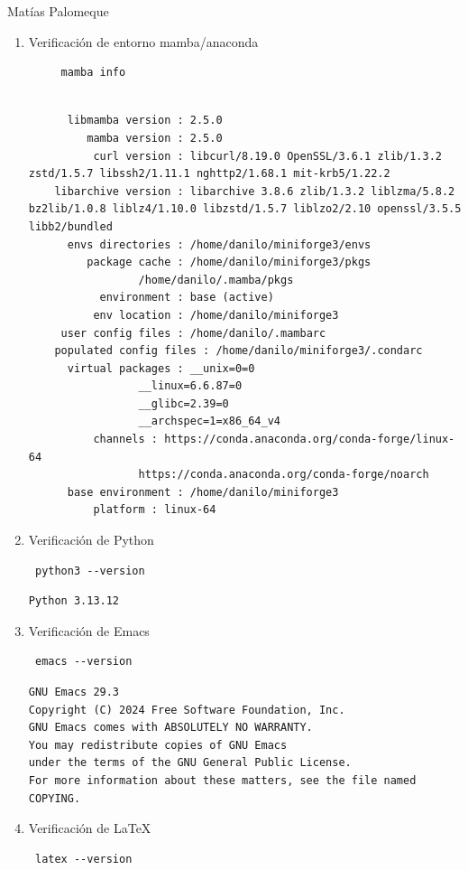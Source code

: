 \documentclass[11pt]{article}
\begin{document}
Matías Palomeque
\begin{enumerate}
\item Verificación de entorno mamba/anaconda
\begin{verbatim}
     mamba info
\end{verbatim}

\begin{verbatim}

	  libmamba version : 2.5.0
	     mamba version : 2.5.0
	      curl version : libcurl/8.19.0 OpenSSL/3.6.1 zlib/1.3.2 zstd/1.5.7 libssh2/1.11.1 nghttp2/1.68.1 mit-krb5/1.22.2
	libarchive version : libarchive 3.8.6 zlib/1.3.2 liblzma/5.8.2 bz2lib/1.0.8 liblz4/1.10.0 libzstd/1.5.7 liblzo2/2.10 openssl/3.5.5 libb2/bundled
	  envs directories : /home/danilo/miniforge3/envs
	     package cache : /home/danilo/miniforge3/pkgs
			     /home/danilo/.mamba/pkgs
	       environment : base (active)
	      env location : /home/danilo/miniforge3
	 user config files : /home/danilo/.mambarc
    populated config files : /home/danilo/miniforge3/.condarc
	  virtual packages : __unix=0=0
			     __linux=6.6.87=0
			     __glibc=2.39=0
			     __archspec=1=x86_64_v4
		  channels : https://conda.anaconda.org/conda-forge/linux-64
			     https://conda.anaconda.org/conda-forge/noarch
	  base environment : /home/danilo/miniforge3
		  platform : linux-64
\end{verbatim}

\item Verificación de Python
\begin{verbatim}
 python3 --version
\end{verbatim}

\begin{verbatim}
Python 3.13.12
\end{verbatim}

\item Verificación de Emacs
\begin{verbatim}
 emacs --version 
\end{verbatim}

\begin{verbatim}
GNU Emacs 29.3
Copyright (C) 2024 Free Software Foundation, Inc.
GNU Emacs comes with ABSOLUTELY NO WARRANTY.
You may redistribute copies of GNU Emacs
under the terms of the GNU General Public License.
For more information about these matters, see the file named COPYING.
\end{verbatim}

\item Verificación de \LaTeX{}
\begin{verbatim}
 latex --version
\end{verbatim}


\end{enumerate}
\end{document}
